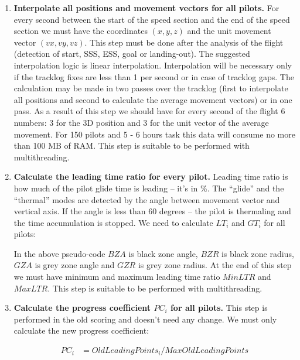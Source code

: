 \documentclass[gap.tex]{subfiles}
\begin{document}
\begin{enumerate}
    \item \textbf{Interpolate all positions and movement vectors for all
        pilots.}  For every second between the start of the speed section and
        the end of the speed section we must have the coordinates \((x, y, z)\)
        and the unit movement vector \((vx, vy, vz)\). This step must be done
        after the analysis of the flight (detection of start, SSS, ESS, goal or
        landing-out). The suggested interpolation logic is linear
        interpolation. Interpolation will be necessary only if the tracklog
        fixes are less than 1 per second or in case of tracklog gaps. The
        calculation may be made in two passes over the tracklog (first to
        interpolate all positions and second to calculate the average movement
        vectors) or in one pass. As a result of this step we should have for
        every second of the flight 6 numbers: 3 for the 3D position and 3 for
        the unit vector of the average movement. For 150 pilots and 5 - 6 hours
        task this data will consume no more than 100 MB of RAM. This step is
        suitable to be performed with multithreading.

    \item \textbf{Calculate the leading time ratio for every pilot.} Leading
        time ratio is how much of the pilot glide time is leading – it’s in \%.
        The “glide” and the “thermal” modes are detected by the angle between
        movement vector and vertical axis. If the angle is less than 60 degrees
        – the pilot is thermaling and the time accumulation is stopped. We need
        to calculate \(LT_i\) and \(GT_i\) for all pilots:

        In the above pseudo-code \(BZA\) is black zone angle, \(BZR\) is black
        zone radius, \(GZA\) is grey zone angle and \(GZR\) is grey zone
        radius. At the end of this step we must have minimum and maximum
        leading time ratio \(MinLTR\) and \(MaxLTR\). This step is suitable to
        be performed with multithreading.

    \item \textbf{Calculate the progress coefficient \(PC_i\) for all pilots.}
        This step is performed in the old scoring and doesn’t need any change.
        We must only calculate the new progress coefficient:
        
        \begin{align*}
            PC_i &= OldLeadingPoints_i / MaxOldLeadingPoints
        \end{align*}


\end{enumerate}
\end{document}
